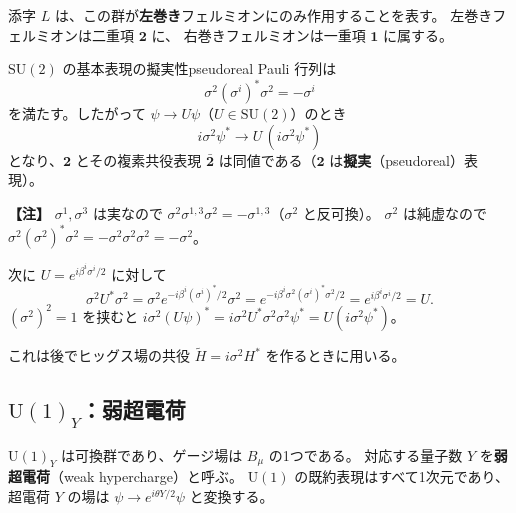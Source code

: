 \documentclass[uplatex,dvipdfmx,a4paper,11pt,openany]{jsbook}
\newcommand{\term}[2]{\textbf{#1}（#2）}
\newenvironment{note}{\vspace{1ex}\par\footnotesize\noindent\textbf{【注】}}{\par\vspace{1ex}}
\numberwithin{equation}{chapter}
\theoremstyle{definition}
\theoremstyle{plain}
\theoremstyle{remark}
\newcommand{\SU}{\mathrm{SU}}
\newcommand{\U}{\mathrm{U}}
\begin{document}
添字 $L$ は、この群が\textbf{左巻き}フェルミオンにのみ作用することを表す。
左巻きフェルミオンは二重項 $\mathbf{2}$ に、
右巻きフェルミオンは一重項 $\mathbf{1}$ に属する。
\begin{myprop}{$\SU(2)$ の基本表現の擬実性}{pseudoreal}
Pauli 行列は
\begin{equation}
\sigma^2(\sigma^i)^*\sigma^2=-\sigma^i
\label{eq:pseudoreal}
\end{equation}
を満たす。したがって $\psi\to U\psi$（$U\in\SU(2)$）のとき
\begin{equation}
i\sigma^2\psi^*\to U\,(i\sigma^2\psi^*)
\end{equation}
となり、$\mathbf{2}$ とその複素共役表現 $\bar{\mathbf{2}}$ は同値である（$\mathbf{2}$ は\term{擬実}{pseudoreal}表現）。
\end{myprop}
\begin{note}
$\sigma^1,\sigma^3$ は実なので $\sigma^2\sigma^{1,3}\sigma^2=-\sigma^{1,3}$（$\sigma^2$ と反可換）。
$\sigma^2$ は純虚なので $\sigma^2(\sigma^2)^*\sigma^2=-\sigma^2\sigma^2\sigma^2=-\sigma^2$。

次に $U=e^{i\beta^i\sigma^i/2}$ に対して
\[
\sigma^2U^*\sigma^2
=\sigma^2e^{-i\beta^i(\sigma^i)^*/2}\sigma^2
=e^{-i\beta^i\sigma^2(\sigma^i)^*\sigma^2/2}
=e^{i\beta^i\sigma^i/2}=U .
\]
$(\sigma^2)^2=1$ を挟むと
$i\sigma^2(U\psi)^*=i\sigma^2U^*\sigma^2\sigma^2\psi^*=U(i\sigma^2\psi^*)$。
\end{note}
これは後でヒッグス場の共役 $\tilde H=i\sigma^2H^*$ を作るときに用いる。
\subsection{$\U(1)_Y$：弱超電荷}
$\U(1)_Y$ は可換群であり、ゲージ場は $B_\mu$ の1つである。
対応する量子数 $Y$ を\term{弱超電荷}{weak hypercharge}と呼ぶ。
$\U(1)$ の既約表現はすべて1次元であり、
超電荷 $Y$ の場は $\psi\to e^{i\theta Y/2}\psi$ と変換する。
\end{document}
